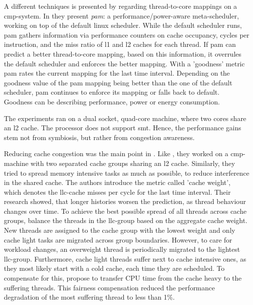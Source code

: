 A different techniques is presented by \citeauthor{banikazemi_pam_2008}
regarding thread-to-core mappings on a \gls{cmp}-system.
In \cite{banikazemi_pam_2008} they present \emph{pam}: a performance/power-aware
meta-scheduler, working on top of the default linux scheduler.
While the default scheduler runs, pam gathers information via performance
counters on cache occupancy, cycles per instruction, and the miss ratio of l1
and l2 caches for each thread.
If pam can predict a better thread-to-core mapping, based on this information,
it overrules the default scheduler and enforces the better mapping.
With a 'goodness' metric pam rates the current mapping for the last
time interval.
Depending on the goodness value of the pam mapping being better than the one of
the default scheduler, pam continues to enforce its mapping or falls back to
default.
Goodness can be describing performance, power or energy consumption.

The experiments ran on a dual socket, quad-core machine, where two cores
share an l2 cache.
The processor does not support \gls{smt}.
Hence, the performance gains stem not from symbiosis, but rather from
congestion awareness.
\\

Reducing cache congestion was the main point in \cite{knauerhase_using_2008}.
Like \citeauthor{banikazemi_pam_2008}, they worked on a \gls{cmp}-machine with
two separated cache groups sharing an l2 cache.
Similarly, they tried to spread memory intensive tasks as much as possible,
to reduce interference in the shared cache.
The authors introduce the metric called 'cache weight', which denotes the
\gls{llc}-cache misses per cycle for the last time interval.
Their research showed, that longer histories worsen the prediction, as thread
behaviour changes over time.
To achieve the best possible spread of all threads across cache groups,
\citeauthor{knauerhase_using_2008} balance the threads in the \gls{llc}-group
based on the aggregate cache weight.
New threads are assigned to the cache group with the lowest weight and only
cache light tasks are migrated across group boundaries.
However, to care for workload changes, an overweight thread is periodically
migrated to the lightest \gls{llc}-group.
Furthermore, cache light threads suffer next to cache intensive ones, as they
most likely start with a cold cache, each time they are scheduled.
To compensate for this, \citeauthor{knauerhase_using_2008} propose to transfer
CPU time from the cache heavy to the suffering threads.
This fairness compensation reduced the performance degradation of the most
suffering thread to less than 1\%.
\\


